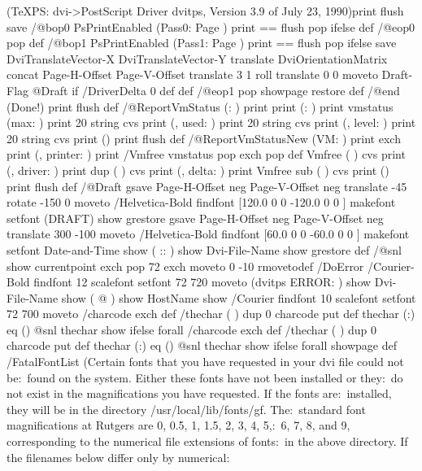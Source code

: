 (TeXPS: dvi->PostScript Driver dvitps, Version 3.9 of July 23, 1990\n)print flush
save
/@bop0
{
PsPrintEnabled { (Pass0: Page ) print == flush } {pop} ifelse
}	def
/@eop0 {
pop
}	def
/@bop1
{
PsPrintEnabled { (Pass1: Page ) print == flush } {pop} ifelse
save
DviTranslateVector-X DviTranslateVector-Y translate
DviOrientationMatrix concat
Page-H-Offset Page-V-Offset translate
3 1 roll
translate
0 0 moveto
Draft-Flag { @Draft } if
/DriverDelta 0 def
} def
/@eop1 {
pop
showpage
restore
} def
/@end {
(Done!\n) print flush
} def
/@ReportVmStatus {
(\n@ReportVmStatus: ) print
print (: ) print
vmstatus
(max: ) print 20 string cvs print
(, used: ) print 20 string cvs print
(, level: ) print 20 string cvs print
(\n) print flush
} def
/@ReportVmStatusNew {
(VM: ) print
exch print
(, printer: ) print
/Vmfree vmstatus pop exch pop def Vmfree (       ) cvs print
(, driver: ) print dup (      ) cvs print
(, delta: ) print
Vmfree sub (      ) cvs print
(\n) print flush
} def
/@Draft {
gsave
Page-H-Offset neg Page-V-Offset neg translate
-45 rotate
-150 0 moveto
/Helvetica-Bold findfont
[120.0 0 0 -120.0 0 0 ] makefont setfont
(DRAFT) show
grestore
gsave
Page-H-Offset neg Page-V-Offset neg translate
300 -100 moveto
/Helvetica-Bold findfont
[60.0 0 0   -60.0 0 0 ] makefont setfont
Date-and-Time		show
(   ::   )	      	show
Dvi-File-Name		show
grestore
} def
/@snl {show currentpoint exch pop 72 exch moveto 0 -10 rmoveto}def
/DoError {
/Courier-Bold findfont 12 scalefont setfont
72 720 moveto
(dvitps ERROR: ) show Dvi-File-Name show ( @ ) show HostName show
/Courier findfont 10 scalefont setfont
72 700 moveto
{/charcode exch def /thechar ( ) dup 0 charcode put def
thechar (:) eq {() @snl} {thechar show} ifelse} forall
{/charcode exch def /thechar ( ) dup 0 charcode put def
thechar (:) eq {() @snl} {thechar show} ifelse} forall
showpage
} def
/FatalFontList (Certain fonts that you have requested in your dvi file could not be:\
found on the system. Either these fonts have not been installed or they:\
do not exist in the magnifications you have requested. If the fonts are:\
installed, they will be in the directory /usr/local/lib/fonts/gf. The:\
standard font magnifications at Rutgers are 0, 0.5, 1, 1.5, 2, 3, 4, 5,:\
6, 7, 8, and 9, corresponding to the numerical file extensions of fonts:\
in the above directory. If the filenames below differ only by numerical:\
